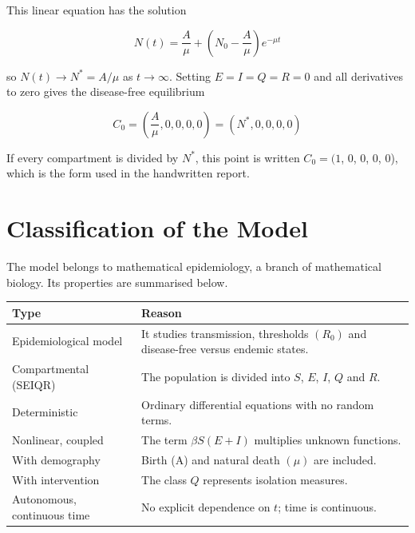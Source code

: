 \documentclass[12pt,a4paper]{article}
\theoremstyle{definition}
\begin{document}
This linear equation has the solution


\begin{equation}
N(t) = \frac{A}{\mu} + \left(N_0 - \frac{A}{\mu}\right)e^{-\mu t}
\end{equation}

so $N(t) \to N^* = A/\mu$ as $t \to \infty$. Setting $E = I = Q = R = 0$ and all derivatives to zero gives the disease-free equilibrium


\begin{equation}
C_0 = \left(\frac{A}{\mu},0,0,0,0\right) = (N^*,0,0,0,0)
\end{equation}

If every compartment is divided by $N^*$, this point is written $C_{0} = (1$, 0, 0, 0, 0), which is the form used in the handwritten report.


\section{Classification of the Model}

The model belongs to mathematical epidemiology, a branch of mathematical biology. Its properties are summarised below.


\begin{longtable}{>{\raggedright\arraybackslash}p{}>{\raggedright\arraybackslash}p{}}
\hline
\rowcolor[HTML]{D9E2F3}\textbf{Type} & \textbf{Reason} \\ \hline
\endhead
Epidemiological model & It studies transmission, thresholds $(R_{0})$ and disease-free versus endemic states. \\ \hline
Compartmental (SEIQR) & The population is divided into $S$, $E$, $I$, $Q$ and $R$. \\ \hline
Deterministic & Ordinary differential equations with no random terms. \\ \hline
Nonlinear, coupled & The term $\beta S(E + I)$ multiplies unknown functions. \\ \hline
With demography & Birth (A) and natural death $(\mu )$ are included. \\ \hline
With intervention & The class $Q$ represents isolation measures. \\ \hline
Autonomous, continuous time & No explicit dependence on $t$; time is continuous. \\ \hline
\end{longtable}
\end{document}
